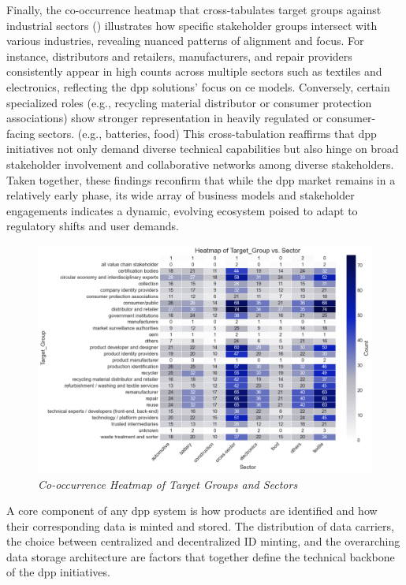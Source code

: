 Finally, the co-occurrence heatmap that cross-tabulates target groups against industrial sectors  () illustrates how specific stakeholder groups intersect with various industries, revealing nuanced patterns of alignment and focus. For instance, distributors and retailers, manufacturers, and repair providers consistently appear in high counts across multiple sectors such as textiles and electronics, reflecting the \ac{dpp} solutions' focus on \acrlong{ce} models. Conversely, certain specialized roles (e.g., recycling material distributor or consumer protection associations) show stronger representation in heavily regulated or consumer-facing sectors. (e.g., batteries, food) This cross-tabulation reaffirms that \ac{dpp} initiatives not only demand diverse technical capabilities but also hinge on broad stakeholder involvement and collaborative networks among diverse stakeholders. Taken together, these findings reconfirm that while the \ac{dpp} market remains in a relatively early phase, its wide array of business models and stakeholder engagements indicates a dynamic, evolving ecosystem poised to adapt to regulatory shifts and user demands.

\begin{figure}[htbp]
  \centering
  \includegraphics[width=\textwidth]{figures/initiatives_target_group_vs_sector.png}
  \caption{%
    \textit{Co-occurrence Heatmap of Target Groups and Sectors} 
  }
  \label{fig:initiatives_target_group_vs_sector}
\end{figure}

A core component of any \ac{dpp} system is how products are identified and how their corresponding data is minted and stored. The distribution of data carriers, the choice between centralized and decentralized ID minting, and the overarching data storage architecture are factors that together define the technical backbone of the \ac{dpp} initiatives.

